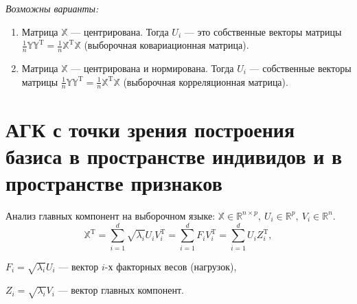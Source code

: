 \documentclass[specialist, 12pt,
subf, %
href, colorlinks=true,
substylefile = spbu.rtx,
]{disser}
\begin{document}
\textit{Возможны варианты:}
\begin{enumerate}
	\item Матрица $\mathbb{X}$ --- центрирована. Тогда $U_i$ --- это собственные векторы матрицы $\frac{1}{n}\mathbb{Y}\mathbb{Y}^\mathrm{T} = \frac{1}{n}\mathbb{X}^\mathrm{T}\mathbb{X}$ (выборочная ковариационная матрица).
	
	\item Матрица $\mathbb{X}$ --- центрирована и нормирована. Тогда $U_i$ --- собственные векторы матрицы $\frac{1}{n}\mathbb{Y}\mathbb{Y}^\mathrm{T} = \frac{1}{n}\mathbb{X}^\mathrm{T}\mathbb{X}$ (выборочная корреляционная матрица).
\end{enumerate}

\section{АГК с точки зрения построения базиса в пространстве индивидов и в пространстве признаков}

Анализ главных компонент на выборочном языке: $\mathbb{X}\in\mathbb{R}^{n\times p},~U_i\in\mathbb{R}^p,~V_i\in\mathbb{R}^n$.
\begin{equation*}
\mathbb{X}^\mathrm{T}=\sum\limits_{i =1}^d \sqrt{\lambda_i} U_i V_i^{\mathrm{T}} = \sum\limits_{i =1}^d F_i V_i^\mathrm{T} = \sum\limits_{i =1}^d U_i Z_i^\mathrm{T},
\end{equation*}

$F_i=\sqrt{\lambda_i} U_i$ --- вектор $i$-х факторных весов (нагрузок),

$Z_i=\sqrt{\lambda_i} V_i$ --- вектор главных компонент.
\end{document}
